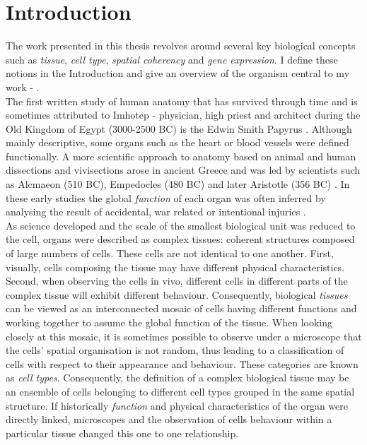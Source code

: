 %
\chapter{Introduction}\label{ch:background}
%
	
	The work presented in this thesis revolves around several key biological concepts such as \emph{tissue}, \emph{cell type}, \emph{spatial coherency} and \emph{gene expression}. I define these notions in the Introduction and give an overview of the organism central to my work - \platyfull{}.\\
	
    The first written study of human anatomy that has survived through time and is sometimes attributed to Imhotep - physician, high priest and architect during the Old Kingdom of Egypt (3000-2500 BC) is the Edwin Smith Papyrus \citep{goodwin98,breasted30}. Although mainly descriptive, some organs such as the heart or blood vessels were defined functionally. A more scientific approach to anatomy based on animal and human dissections and vivisections arose in ancient Greece and was led by scientists such as Alcmaeon (510 BC),  Empedocles (480 BC) and later Aristotle (356 BC) \citep{singer57}. In these early studies the global \emph{function} of each organ was often inferred by analysing the result of accidental, war related or intentional injuries \citep{singer57}.\\ 
    
    As science developed and the scale of the smallest biological unit was reduced to the cell, organs were described as complex tissues: coherent structures composed of large numbers of cells. These cells are not identical to one another. First, visually, cells composing the tissue may have different physical characteristics. Second, when observing the cells in vivo, different cells in different parts of the complex tissue will exhibit different behaviour. Consequently, biological \emph{tissues} can be viewed as an interconnected mosaic of cells having different functions and working together to assume the global function of the tissue. When looking closely at this mosaic, it is sometimes possible to observe under a microscope \citep{young13} that the cells' spatial organisation is not random, thus leading to a classification of cells with respect to their appearance and behaviour. These categories are known as \emph{cell types}. Consequently, the definition of a complex biological tissue may be an ensemble of cells belonging to different cell types grouped in the same spatial structure.  If historically \emph{function} and physical characteristics of the organ were directly linked, microscopes and the observation of cells behaviour within a particular tissue changed this one to one relationship.\\
    
